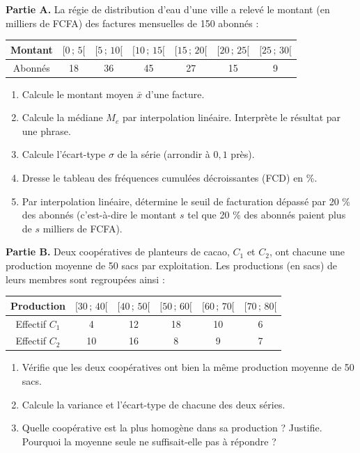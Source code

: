 \documentclass[11pt]{article}
\begin{document}
\begin{exercice}
\textbf{Partie A.} La régie de distribution d'eau d'une ville a relevé le montant (en milliers de FCFA) des factures mensuelles de 150 abonnés :
\begin{center}
\begin{tabular}{|c|cccccc|}\hline
Montant & $[0\,;\,5[$ & $[5\,;\,10[$ & $[10\,;\,15[$ & $[15\,;\,20[$ & $[20\,;\,25[$ & $[25\,;\,30[$ \\ \hline
Abonnés & 18 & 36 & 45 & 27 & 15 & 9 \\ \hline
\end{tabular}
\end{center}
\begin{enumerate}
\item Calcule le montant moyen $\bar{x}$ d'une facture.
\item Calcule la médiane $M_e$ par interpolation linéaire. Interprète le résultat par une phrase.
\item Calcule l'écart-type $\sigma$ de la série (arrondir à $0{,}1$ près).
\item Dresse le tableau des fréquences cumulées décroissantes (FCD) en \%.
\item Par interpolation linéaire, détermine le seuil de facturation dépassé par 20 \% des abonnés (c'est-à-dire le montant $s$ tel que 20 \% des abonnés paient plus de $s$ milliers de FCFA).
\end{enumerate}
\textbf{Partie B.} Deux coopératives de planteurs de cacao, $C_1$ et $C_2$, ont chacune une production moyenne de 50 sacs par exploitation. Les productions (en sacs) de leurs membres sont regroupées ainsi :
\begin{center}
\begin{tabular}{|c|ccccc|}\hline
Production & $[30\,;\,40[$ & $[40\,;\,50[$ & $[50\,;\,60[$ & $[60\,;\,70[$ & $[70\,;\,80[$ \\ \hline
Effectif $C_1$ & 4 & 12 & 18 & 10 & 6 \\ \hline
Effectif $C_2$ & 10 & 16 & 8 & 9 & 7 \\ \hline
\end{tabular}
\end{center}
\begin{enumerate}
\item[6.] Vérifie que les deux coopératives ont bien la même production moyenne de 50 sacs.
\item[7.] Calcule la variance et l'écart-type de chacune des deux séries.
\item[8.] Quelle coopérative est la plus homogène dans sa production ? Justifie. Pourquoi la moyenne seule ne suffisait-elle pas à répondre ?
\end{enumerate}
\end{exercice}
\end{document}
